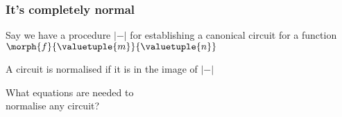 \begin{frame}
    \frametitle{It's completely normal}

    \centering
    \LARGE

    Say we have a procedure \(|-|\) for
    establishing a \alert{canonical circuit} for a function
    \(\morph{f}{\valuetuple{m}}{\valuetuple{n}}\)

    \pause

    \vspace{1em}

    A circuit is \alert{normalised} if it is in the image of \(|-|\)

    \pause

    \vspace{1em}

    What equations are needed to \\ normalise any circuit?

\end{frame}

